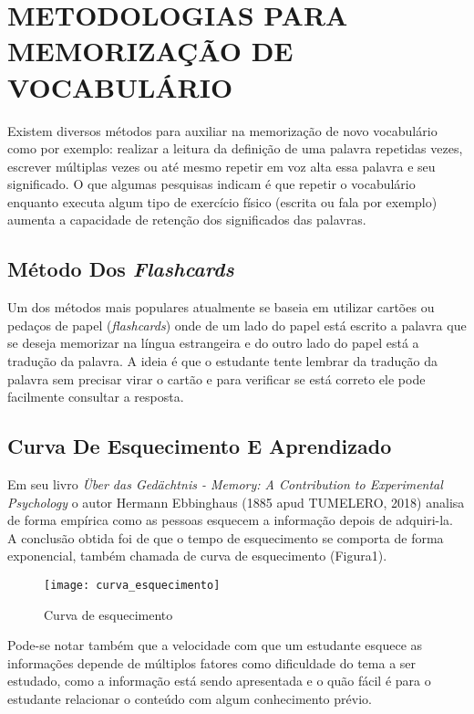 \chapter{METODOLOGIAS PARA MEMORIZAÇÃO DE VOCABULÁRIO}
\label{chap:metodologias}
Existem diversos métodos para auxiliar na memorização de novo vocabulário como por exemplo: realizar a leitura da definição de uma palavra repetidas vezes, escrever múltiplas vezes ou até mesmo repetir em voz alta essa palavra e seu significado. O que algumas pesquisas indicam é que repetir o vocabulário enquanto executa algum tipo de exercício físico (escrita ou fala por exemplo) aumenta a capacidade de retenção dos significados das palavras.

\section{Método Dos \textit{Flashcards}}
Um dos métodos mais populares atualmente se baseia em utilizar cartões ou pedaços de papel (\textit{flashcards}) onde de um lado do papel está escrito a palavra que se deseja memorizar na língua estrangeira e do outro lado do papel está a tradução da palavra. A ideia é que o estudante tente lembrar da tradução da palavra sem precisar virar o cartão e para verificar se está correto ele pode facilmente consultar a resposta.

\section{Curva De Esquecimento E Aprendizado }
Em seu livro \textit{Über das Gedächtnis - Memory: A Contribution to Experimental Psychology} o autor Hermann Ebbinghaus (1885 apud TUMELERO, 2018) analisa de forma empírica como as pessoas esquecem a informação depois de adquiri-la. A conclusão obtida foi de que o tempo de esquecimento se comporta de forma exponencial, também chamada de curva de esquecimento (Figura1).

\begin{figure}[H]
\caption{\label{fig:curva_esquecimento}Curva de esquecimento}
\begin{center}
\texttt{[image: curva\_esquecimento]}
\end{center}
\end{figure}

Pode-se notar também que a velocidade com que um estudante esquece as informações depende de múltiplos fatores como dificuldade do tema a ser estudado, como a informação está sendo apresentada e o quão fácil é para o estudante relacionar o conteúdo com algum conhecimento prévio.

